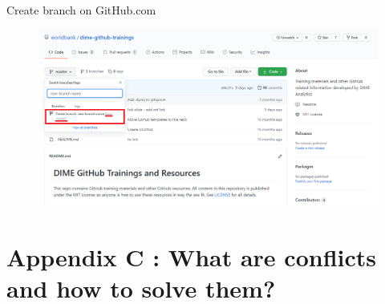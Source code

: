 \documentclass[aspectratio=169]{beamer} %
\begin{document}
\begin{frame}{Create branch on GitHub.com}
\begin{figure}
	\centering
	\includegraphics[width=.9\textwidth]{./img/new-branch-3.png}
\end{figure}
\hyperlink{Create a branch}{}
\end{frame}

\section{Appendix C : What are conflicts and how to solve them?}
\end{document}
